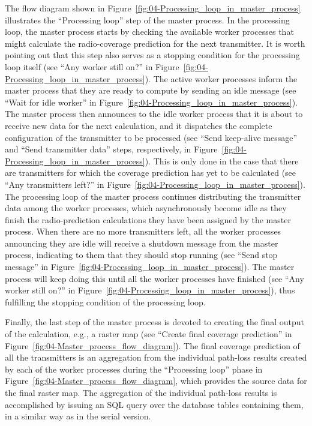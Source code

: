 The flow diagram shown in Figure~\ref{fig:04-Processing_loop_in_master_process}
illustrates the ``Processing loop'' step of the master process.
In the processing loop, the master process starts by checking the
available worker processes that might calculate the radio-coverage
prediction for the next transmitter. It is worth pointing out that
this step also serves as a stopping condition for the processing loop
itself (see ``Any worker still on?'' in Figure~\ref{fig:04-Processing_loop_in_master_process}).
The active worker processes inform the master process that they are
ready to compute by sending an idle message (see ``Wait for idle
worker'' in Figure~\ref{fig:04-Processing_loop_in_master_process}).
The master process then announces to the idle worker process that
it is about to receive new data for the next calculation, and it dispatches
the complete configuration of the transmitter to be processed (see
``Send keep-alive message'' and ``Send transmitter data'' steps,
respectively, in Figure~\ref{fig:04-Processing_loop_in_master_process}).
This is only done in the case that there are transmitters for which
the coverage prediction has yet to be calculated (see ``Any transmitters
left?'' in Figure~\ref{fig:04-Processing_loop_in_master_process}).
The processing loop of the master process continues distributing the
transmitter data among the worker processes, which asynchronously
become idle as they finish the radio-prediction calculations they
have been assigned by the master process. When there are no more transmitters
left, all the worker processes announcing they are idle will receive
a shutdown message from the master process, indicating to them that
they should stop running (see ``Send stop message'' in Figure~\ref{fig:04-Processing_loop_in_master_process}).
The master process will keep doing this until all the worker processes
have finished (see ``Any worker still on?'' in Figure~\ref{fig:04-Processing_loop_in_master_process}),
thus fulfilling the stopping condition of the processing loop.

Finally, the last step of the master process is devoted to creating
the final output of the calculation, e.g., a raster map (see ``Create
final coverage prediction'' in Figure~\ref{fig:04-Master_process_flow_diagram}).
The final coverage prediction of all the transmitters is an aggregation
from the individual path-loss results created by each of the worker
processes during the ``Processing loop'' phase in Figure~\ref{fig:04-Master_process_flow_diagram},
which provides the source data for the final raster map. The aggregation
of the individual path-loss results is accomplished by issuing an
SQL query over the database tables containing them, in a similar way
as in the serial version.


